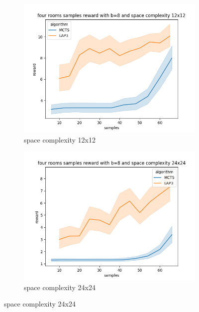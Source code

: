 \documentclass[bibliography=totoc]{scrartcl}
\begin{document}
\begin{figure}[h!]
    \centering
    \begin{subfigure}[b]{0.3\linewidth}
        \includegraphics[width=\linewidth]{img/four_rooms_samples__reward_b_8_LAP3_MCTS_12.png}
        \caption{space complexity 12x12}
    \end{subfigure}
    \hspace{0.02\textwidth}
    \begin{subfigure}[b]{0.3\linewidth}
        \includegraphics[width=\linewidth]{img/four_rooms_samples__reward_b_8_LAP3_MCTS_24.png}
        \caption{space complexity 24x24}
    \end{subfigure}
    \hspace{0.02\textwidth}

\end{figure}
\end{document}
